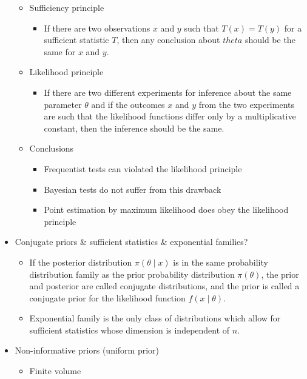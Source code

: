 \documentclass[a4paper]{article}
\begin{document}
\begin{itemize}
\begin{itemize}
\begin{itemize}
        \end{itemize}
        \item Sufficiency principle
        \begin{itemize}
            \item If there are two observations $x$ and $y$ such that $T(x)=T(y)$ for a sufficient statistic $T$, then any conclusion about $theta$ should be the same for $x$ and $y$.
        \end{itemize}
        \item Likelihood principle
        \begin{itemize}
            \item If there are two different experiments for inference about the same parameter $\theta$ and if the outcomes $x$ and $y$ from the two experiments are such that the likelihood functions differ only by a multiplicative constant, then the inference should be the same.
        \end{itemize}
        \item Conclusions
        \begin{itemize}
            \item Frequentist tests can violated the likelihood principle
            \item Bayesian tests do not suffer from this drawback
            \item Point estimation by maximum likelihood does obey the likelihood principle
        \end{itemize}
    \end{itemize}
    \item Conjugate priors \& sufficient statistics \& exponential families?
    \begin{itemize}
        \item If the posterior distribution $\pi(\theta\mid x)$ is in the same probability distribution family as the prior probability distribution $\pi(\theta)$, the prior and posterior are called conjugate distributions, and the prior is called a conjugate prior for the likelihood function $f(x\mid\theta)$.
        \item Exponential family is the only class of distributions which allow for sufficient statistics whose dimension is independent of $n$.
    \end{itemize}
    \item Non-informative priors (uniform prior)
    \begin{itemize}
        \item Finite volume

\end{itemize}
\end{itemize}
\end{document}
